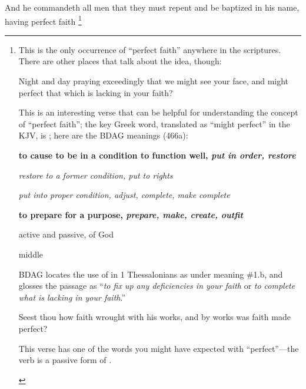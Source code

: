 			And he commandeth all men that they must repent and be baptized in his name,
			having perfect faith%
				\footnote{%
					\label{2NEPHI-9-23-perfect}%
					\label{KATARTIZO}%
					This is the only occurrence of ``perfect faith'' anywhere in the scriptures. There are other places that talk about the idea, though:
						\begin{compactdesc}
							\item[{\hyperref[1THESSALONIANS-3-10]{1 Thessalonians 3:10}}] Night and day praying exceedingly that we might see your face, and might perfect that which is lacking in your faith?
								\begin{compactitem}
									\item This is an interesting verse that can be helpful for understanding the concept of ``perfect faith''; the key Greek word, translated as ``might perfect'' in the KJV, is ; here are the BDAG meanings (466a):
										\begin{compactitem}
											\item[1] \textbf{to cause to be in a condition to function well, \textit{put in order, restore}}
											\item[1.a] \textit{restore to a former condition, put to rights}
											\item[1.b] \textit{put into proper condition, adjust, complete, make complete}
											\item[2] \textbf{to prepare for a purpose, \textit{prepare, make, create, outfit}}
											\item[2.a] active and passive, of God
											\item[2.b] middle
										\end{compactitem}
									\item BDAG locates the use of  in 1 Thessalonians as under meaning \#1.b, and glosses the passage as ``\textit{to fix up any deficiencies in your faith} or \textit{to complete what is lacking in your faith}.''
								\end{compactitem}
							\item[{\hyperref[JAMES-2-22]{James 2:22}}] Seest thou how faith wrought with his works, and by works was faith made perfect?
								\begin{compactitem}
									\item This verse has one of the words you might have expected with ``perfect''---the verb is a passive form of \gr{τελειόω}.
								\end{compactitem}
							\item[{\hyperref[ALMA-32]{Alma 32}}] \phantom{.}

\end{compactdesc}}
